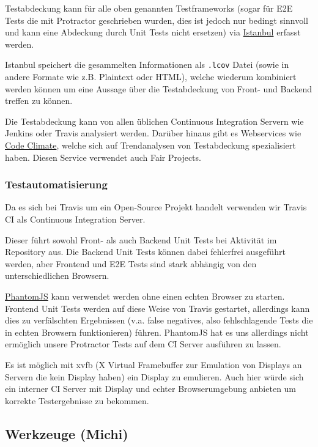 Testabdeckung kann für alle oben genannten Testframeworks (sogar für E2E
Tests die mit Protractor geschrieben wurden, dies ist jedoch nur bedingt
sinnvoll und kann eine Abdeckung durch Unit Tests nicht ersetzen) via
\href{https://gotwarlost.github.io/istanbul/}{Istanbul} erfasst werden.

Istanbul speichert die gesammelten Informationen als \texttt{.lcov}
Datei (sowie in andere Formate wie z.B. Plaintext oder HTML), welche
wiederum kombiniert werden können um eine Aussage über die Testabdeckung
von Front- und Backend treffen zu können.

Die Testabdeckung kann von allen üblichen Continuous Integration Servern
wie Jenkins oder Travis analysiert werden. Darüber hinaus gibt es
Webservices wie
\href{https://codeclimate.com/github/mihaeu/fair-projects/coverage}{Code
Climate}, welche sich auf Trendanalysen von Testabdeckung spezialisiert
haben. Diesen Service verwendet auch Fair Projects.

\subsubsection{Testautomatisierung}\label{testautomatisierung}

Da es sich bei Travis um ein Open-Source Projekt handelt verwenden wir
Travis CI als Continuous Integration Server.

Dieser führt sowohl Front- als auch Backend Unit Tests bei Aktivität im
Repository aus. Die Backend Unit Tests können dabei fehlerfrei
ausgeführt werden, aber Frontend und E2E Tests sind stark abhängig von
den unterschiedlichen Browsern.

\href{http://phantomjs.org/}{PhantomJS} kann verwendet werden ohne einen
echten Browser zu starten. Frontend Unit Tests werden auf diese Weise
von Travis gestartet, allerdings kann dies zu verfälschten Ergebnissen
(v.a. false negatives, also fehlschlagende Tests die in echten Browsern
funktionieren) führen. PhantomJS hat es uns allerdings nicht ermöglich
unsere Protractor Tests auf dem CI Server ausführen zu lassen.

Es ist möglich mit xvfb (X Virtual Framebuffer zur Emulation von
Displays an Servern die kein Display haben) ein Display zu emulieren.
Auch hier würde sich ein interner CI Server mit Display und echter
Browserumgebung anbieten um korrekte Testergebnisse zu bekommen.

\subsection{Werkzeuge (Michi)}\label{werkzeuge-michi}

